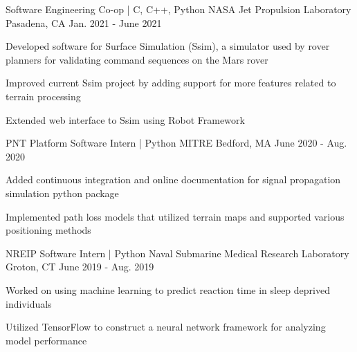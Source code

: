 
\begin{cventries}
  \cventry
    {Software Engineering Co-op | C, C++, Python} %
    {NASA Jet Propulsion Laboratory} %
    {Pasadena, CA} %
    {Jan. 2021 - June 2021} %
    {
      \begin{cvitems} %
        \item {Developed software for Surface Simulation (Ssim), a simulator used by rover planners for validating command sequences on the Mars rover}
        \item {Improved current Ssim project by adding support for more features related to terrain processing}
        \item {Extended web interface to Ssim using Robot Framework}
      \end{cvitems}
    }

  \cventry
    {PNT Platform Software Intern | Python} %
    {MITRE} %
    {Bedford, MA} %
    {June 2020 - Aug. 2020} %
    {
      \begin{cvitems} %
        \item {Added continuous integration and online documentation for signal propagation 
        simulation python package}
        \item {Implemented path loss models that utilized terrain maps and supported various positioning methods}
      \end{cvitems}
    }

  \cventry
    {NREIP Software Intern | Python} %
    {Naval Submarine Medical Research Laboratory} %
    {Groton, CT} %
    {June 2019 - Aug. 2019} %
    {
      \begin{cvitems} %
        \item {Worked on using machine learning to predict reaction time in sleep deprived individuals}
        \item {Utilized TensorFlow to construct a neural network framework for analyzing model performance}
      \end{cvitems}
    }


\end{cventries}
